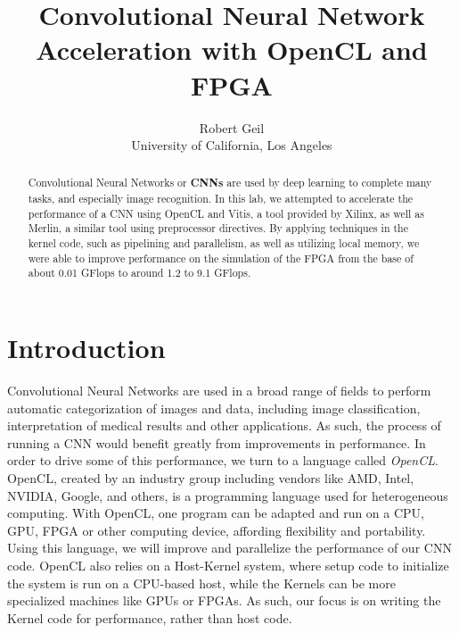 \documentclass[letterpaper,twocolumn,10pt]{article}
\begin{document}

\date{}

\title{\Large \bf Convolutional Neural Network Acceleration with OpenCL
and FPGA}

\author{
{\rm Robert Geil}\\
University of California, Los Angeles
} %

\maketitle

\begin{abstract}
Convolutional Neural Networks or \textbf{CNNs} are used by deep learning to
complete many tasks, and especially image recognition. In this lab, we 
attempted to accelerate the performance of a CNN using OpenCL and Vitis, a tool
provided by Xilinx, as well as Merlin, a similar tool using preprocessor
directives. By applying techniques in the kernel code, such as pipelining and
parallelism, as well as utilizing local memory, we were able to improve
performance on the simulation of the FPGA from the base of about 0.01 GFlops
to around 1.2 to 9.1 GFlops.
\end{abstract}

\section{Introduction}

Convolutional Neural Networks are used in a broad range of fields to perform
automatic categorization of images and data, including image classification,
interpretation of medical results and other applications. As such, the process
of running a CNN would benefit greatly from improvements in performance. In
order to drive some of this performance, we turn to a language called
\textit{OpenCL}. OpenCL, created by an industry group including vendors like
AMD, Intel, NVIDIA, Google, and others, is a programming language used for
heterogeneous computing. With OpenCL, one program can be adapted and run on a
CPU, GPU, FPGA or other computing device, affording flexibility and
portability. Using this language, we will improve and parallelize the
performance of our CNN code. OpenCL also relies on a Host-Kernel system, where
setup code to initialize the system is run on a CPU-based host, while the
Kernels can be more specialized machines like GPUs or FPGAs. As such, our focus
is on writing the Kernel code for performance, rather than host code.
\end{document}
